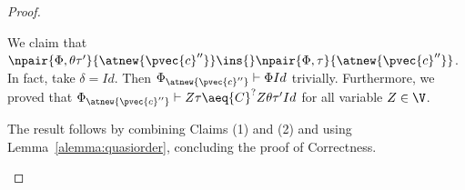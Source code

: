 \begin{proof}
\begin{itemize}
                \begin{claim}[1]
                \end{claim}

                \begin{claim}[2]
                    We claim that $\npair{\Phi,\theta\tau'}{\atnew{\pvec{c}''}} \ins{} \npair{\Phi,\tau}{\atnew{\pvec{c}''}}$. In fact, take $\delta = Id$. Then $\Phi_{\atnew{\pvec{c}''}} \vdash \Phi Id$ trivially. Furthermore, we proved that $\Phi_{\atnew{\pvec{c}''}} \vdash Z\tau \aeq{C}^? Z\theta\tau'Id$ for all variable $Z\in\V$. 
                \end{claim}

        The result follows by combining Claims (1) and (2) and using Lemma~\ref{alemma:quasiorder}, concluding the proof of Correctness.

        \end{itemize}
\end{proof}